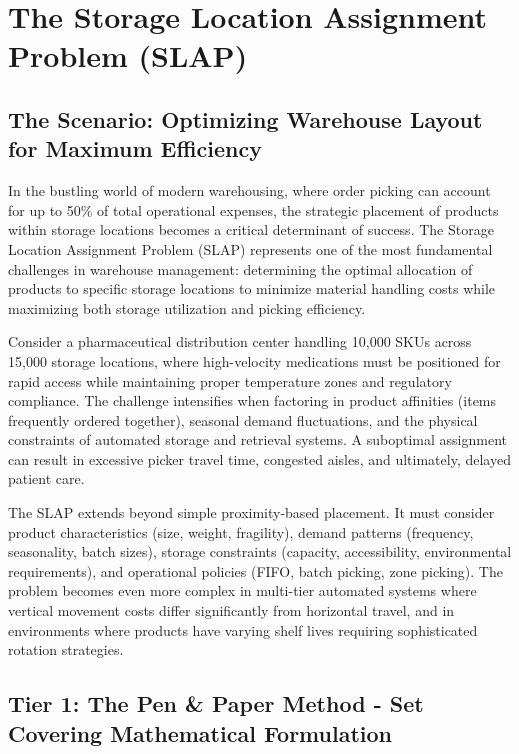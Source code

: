 \documentclass{article}
\begin{document}
\section{The Storage Location Assignment Problem (SLAP)}

\subsection{The Scenario: Optimizing Warehouse Layout for Maximum Efficiency}

In the bustling world of modern warehousing, where order picking can account for up to 50\% of total operational expenses, the strategic placement of products within storage locations becomes a critical determinant of success. The Storage Location Assignment Problem (SLAP) represents one of the most fundamental challenges in warehouse management: determining the optimal allocation of products to specific storage locations to minimize material handling costs while maximizing both storage utilization and picking efficiency.

Consider a pharmaceutical distribution center handling 10,000 SKUs across 15,000 storage locations, where high-velocity medications must be positioned for rapid access while maintaining proper temperature zones and regulatory compliance. The challenge intensifies when factoring in product affinities (items frequently ordered together), seasonal demand fluctuations, and the physical constraints of automated storage and retrieval systems. A suboptimal assignment can result in excessive picker travel time, congested aisles, and ultimately, delayed patient care.

The SLAP extends beyond simple proximity-based placement. It must consider product characteristics (size, weight, fragility), demand patterns (frequency, seasonality, batch sizes), storage constraints (capacity, accessibility, environmental requirements), and operational policies (FIFO, batch picking, zone picking). The problem becomes even more complex in multi-tier automated systems where vertical movement costs differ significantly from horizontal travel, and in environments where products have varying shelf lives requiring sophisticated rotation strategies.

\subsection{Tier 1: The Pen \& Paper Method - Set Covering Mathematical Formulation}
\end{document}
